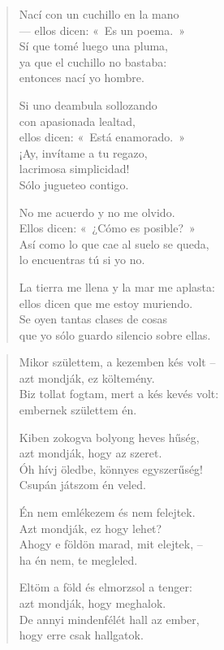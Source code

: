 \documentclass[11pt]{extbook}
\newcommand*{\centeredornament}{\centerline{\pgfornament[width=6cm]{88}}}
\begin{document}
\begin{verse}
  Nací con un cuchillo en la mano \\
  --- ellos dicen: «~Es un poema.~» \\
  Sí que tomé luego una pluma, \\
  ya que el cuchillo no bastaba: \\
  entonces nací yo hombre.

  Si uno deambula sollozando \\
  con apasionada lealtad, \\
  ellos dicen: «~Está enamorado.~» \\
  ¡Ay, invítame a tu regazo, \\
  lacrimosa simplicidad! \\
  Sólo jugueteo contigo.

  No me acuerdo y no me olvido. \\
  Ellos dicen: «~¿Cómo es posible?~» \\
  Así como lo que cae al suelo se queda, \\
  lo encuentras tú si yo no.

  La tierra me llena y la mar me aplasta: \\
  ellos dicen que me estoy muriendo. \\
  Se oyen tantas clases de cosas \\
  que yo sólo guardo silencio sobre ellas.
\end{verse}

\newpage

\vspace*{-15mm}
\centeredornament



\begin{verse}
  Mikor születtem, a kezemben kés volt -- \\
  azt mondják, ez költemény. \\
  Biz tollat fogtam, mert a kés kevés volt: \\
  embernek születtem én.

  Kiben zokogva bolyong heves hűség, \\
  azt mondják, hogy az szeret. \\
  Óh hívj öledbe, könnyes egyszerűség! \\
  Csupán játszom én veled.

  Én nem emlékezem és nem felejtek. \\
  Azt mondják, ez hogy lehet? \\
  Ahogy e földön marad, mit elejtek, -- \\
  ha én nem, te megleled.

  Eltöm a föld és elmorzsol a tenger: \\
  azt mondják, hogy meghalok. \\
  De annyi mindenfélét hall az ember, \\
  hogy erre csak hallgatok.
\end{verse}
\end{document}
